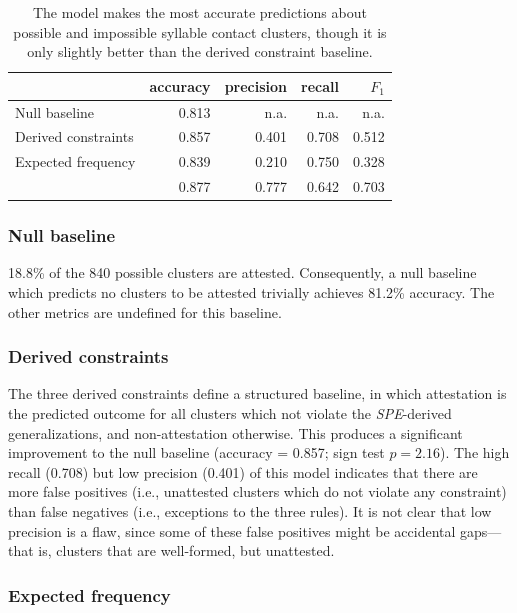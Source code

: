 \begin{table} \centering
\begin{tabular}{l | r r r r}
\toprule
                          & accuracy & precision & recall & $F_1$ \\
\midrule
Null baseline             & 0.813    & n.a.      & n.a.   & n.a.  \\
Derived constraints       & 0.857    & 0.401     & 0.708  & 0.512 \\
Expected frequency        & 0.839    & 0.210     & 0.750  & 0.328 \\
\citet{Hayes2008a}        & 0.877    & 0.777     & 0.642  & 0.703 \\
\bottomrule
\end{tabular}
\caption{The \citeauthor{Hayes2008a} model makes the most accurate predictions about possible and impossible syllable contact clusters, though it is only slightly better than the derived constraint baseline.}
\label{cmresults}
\end{table}

\subsubsection{Null baseline}

18.8\% of the 840 possible clusters are attested. Consequently, a null baseline which predicts no clusters to be attested trivially achieves 81.2\% accuracy. The other metrics are undefined for this baseline.

\subsubsection{Derived constraints}

The three derived constraints define a structured baseline, in which attestation is the predicted outcome for all clusters which not violate the \emph{SPE}-derived generalizations, and non-attestation otherwise. This produces a significant improvement to the null baseline (accuracy = 0.857; sign test $p = 2.16$). The high recall (0.708) but low precision (0.401) of this model indicates that there are more false positives (i.e., unattested clusters which do not violate any constraint) than false negatives (i.e., exceptions to the three rules). It is not clear that low precision is a flaw, since some of these false positives might be accidental gaps---that is, clusters that are well-formed, but unattested.

\subsubsection{Expected frequency}

